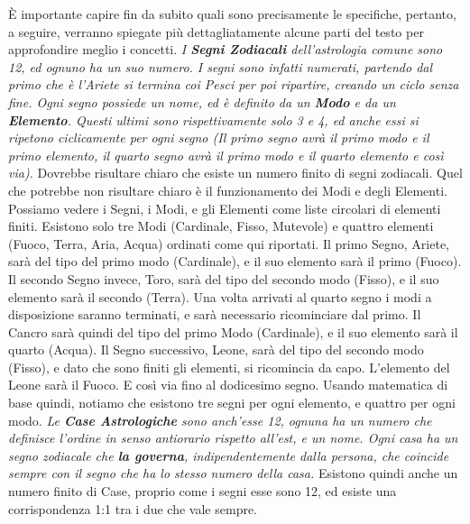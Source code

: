 \mline
È importante capire fin da subito quali sono precisamente le specifiche, pertanto, a seguire, verranno spiegate più dettagliatamente alcune parti del testo per approfondire meglio i concetti.
\mline
\textit{
  I \textbf{Segni Zodiacali} dell'astrologia comune sono 12, ed ognuno ha un suo numero. I segni sono infatti numerati, partendo dal primo che è l'Ariete si termina coi Pesci per poi ripartire, creando un ciclo senza fine. Ogni segno possiede un nome, ed è definito da un \textbf{Modo} e da un \textbf{Elemento}. Questi ultimi sono rispettivamente solo 3 e 4, ed anche essi si ripetono ciclicamente per ogni segno (Il primo segno avrà il primo modo e il primo elemento, il quarto segno avrà il primo modo e il quarto elemento e così via).
}
\mline
Dovrebbe risultare chiaro che esiste un numero finito di segni zodiacali. Quel che potrebbe non risultare chiaro è il funzionamento dei Modi e degli Elementi. Possiamo vedere  i Segni, i Modi, e gli Elementi come liste circolari di elementi finiti. Esistono solo tre Modi (Cardinale, Fisso, Mutevole) e quattro elementi (Fuoco, Terra, Aria, Acqua) ordinati come qui riportati.\newline
Il primo Segno, Ariete, sarà del tipo del primo modo (Cardinale), e il suo elemento sarà il primo (Fuoco).\newline
Il secondo Segno invece, Toro, sarà del tipo del secondo modo (Fisso), e il suo elemento sarà il secondo (Terra).\newline
Una volta arrivati al quarto segno i modi a disposizione saranno terminati, e sarà necessario ricominciare dal primo. Il Cancro sarà quindi del tipo del primo Modo (Cardinale), e il suo elemento sarà il quarto (Acqua).\newline
Il Segno successivo, Leone, sarà del tipo del secondo modo (Fisso), e dato che sono finiti gli elementi, si ricomincia da capo. L'elemento del Leone sarà il Fuoco.\newline
E così via fino al dodicesimo segno.\newline
Usando matematica di base quindi, notiamo che esistono tre segni per ogni elemento, e quattro per ogni modo.
\mline
\textit{
  Le \textbf{Case Astrologiche} sono anch'esse 12, ognuna ha un numero che definisce l'ordine in senso antiorario rispetto all'est, e un nome.
  Ogni casa ha un segno zodiacale che \textbf{la governa}, indipendentemente dalla persona, che coincide sempre con il segno che ha lo stesso numero della casa.
}
\mline
Esistono quindi anche un numero finito di Case, proprio come i segni esse sono 12, ed esiste una corrispondenza 1:1 tra i due che vale sempre.
